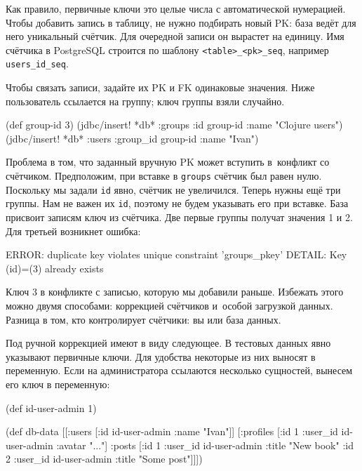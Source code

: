 
Как правило, первичные ключи это целые числа с автоматической нумерацией. Чтобы
добавить запись в таблицу, не нужно подбирать новый PK: база ведёт для него
уникальный счётчик. Для очередной записи он вырастет на единицу. Имя счётчика в
PostgreSQL строится по шаблону \verb|<table>_<pk>_seq|, например
\verb|users_id_seq|.

Чтобы связать записи, задайте их PK и FK одинаковые значения. Ниже пользователь
ссылается на группу; ключ группы взяли случайно.

\begin{english}
  \begin{clojure}
(def group-id 3)
(jdbc/insert! *db* :groups {:id group-id :name "Clojure users"})
(jdbc/insert! *db* :users {:group_id group-id :name "Ivan"})
  \end{clojure}
\end{english}

Проблема в том, что заданный вручную PK может вступить в~конфликт со
счётчиком. Предположим, при вставке в \verb|groups| счётчик был равен
нулю. Поскольку мы задали \verb|id| явно, счётчик не увеличился. Теперь нужны
ещё три группы. Нам не важен их \verb|id|, поэтому не будем указывать его при
вставке. База присвоит записям ключ из счётчика. Две первые группы получат
значения 1 и 2. Для третьей возникнет ошибка:


\begin{english}
  \begin{text}
ERROR: duplicate key violates unique constraint 'groups_pkey'
DETAIL: Key (id)=(3) already exists
  \end{text}
\end{english}

Ключ 3 в конфликте с записью, которую мы добавили раньше. Избежать этого можно
двумя способами: коррекцией счётчиков и~особой загрузкой данных. Разница в том,
кто контролирует счётчики: вы или база данных.

Под ручной коррекцией имеют в виду следующее. В тестовых данных явно указывают
первичные ключи. Для удобства некоторые из них выносят в переменную. Если на
администратора ссылаются несколько сущностей, вынесем его ключ в переменную:

\begin{english}
  \begin{clojure}
(def id-user-admin 1)

(def db-data
  [[:users [{:id id-user-admin :name "Ivan"}]]
   [:profiles [{:id 1 :user_id id-user-admin :avatar "..."}]
    :posts [{:id 1 :user_id id-user-admin :title "New book"}
            {:id 2 :user_id id-user-admin :title "Some post"}]]])
  \end{clojure}
\end{english}

